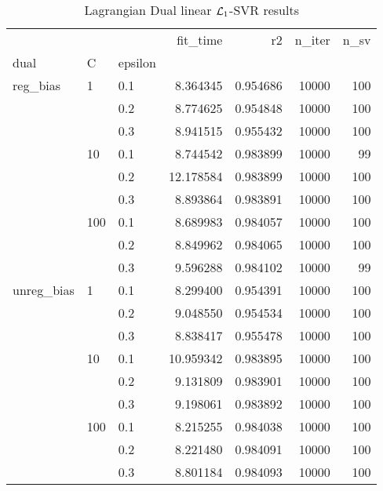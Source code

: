 \begin{table}[H]
\centering
\caption{Lagrangian Dual linear $\protect \mathcal{L}_1$-SVR results}
\label{linear_lagrangian_dual_l1_svr_cv_results}
\begin{tabular}{lllrrrr}
\toprule
           &     &     &   fit\_time &        r2 &  n\_iter &  n\_sv \\
dual & C & epsilon &            &           &         &       \\
\midrule
reg\_bias & 1   & 0.1 &   8.364345 &  0.954686 &   10000 &   100 \\
           &     & 0.2 &   8.774625 &  0.954848 &   10000 &   100 \\
           &     & 0.3 &   8.941515 &  0.955432 &   10000 &   100 \\
           & 10  & 0.1 &   8.744542 &  0.983899 &   10000 &    99 \\
           &     & 0.2 &  12.178584 &  0.983899 &   10000 &   100 \\
           &     & 0.3 &   8.893864 &  0.983891 &   10000 &   100 \\
           & 100 & 0.1 &   8.689983 &  0.984057 &   10000 &   100 \\
           &     & 0.2 &   8.849962 &  0.984065 &   10000 &   100 \\
           &     & 0.3 &   9.596288 &  0.984102 &   10000 &    99 \\
unreg\_bias & 1   & 0.1 &   8.299400 &  0.954391 &   10000 &   100 \\
           &     & 0.2 &   9.048550 &  0.954534 &   10000 &   100 \\
           &     & 0.3 &   8.838417 &  0.955478 &   10000 &   100 \\
           & 10  & 0.1 &  10.959342 &  0.983895 &   10000 &   100 \\
           &     & 0.2 &   9.131809 &  0.983901 &   10000 &   100 \\
           &     & 0.3 &   9.198061 &  0.983892 &   10000 &   100 \\
           & 100 & 0.1 &   8.215255 &  0.984038 &   10000 &   100 \\
           &     & 0.2 &   8.221480 &  0.984091 &   10000 &   100 \\
           &     & 0.3 &   8.801184 &  0.984093 &   10000 &   100 \\
\bottomrule
\end{tabular}
\end{table}
